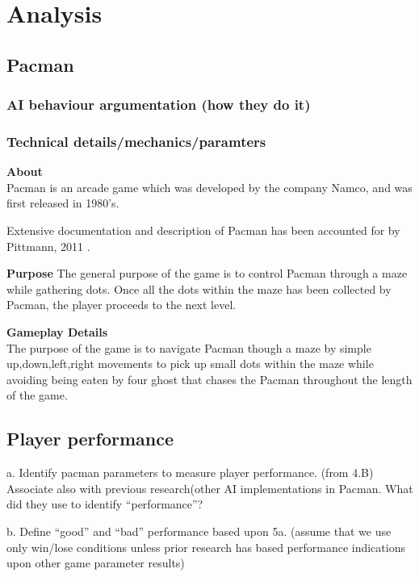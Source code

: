 \section{Analysis} \label{sec:analysis}




\subsection{Pacman}
\subsubsection{AI behaviour argumentation (how they do it)}
\subsubsection{Technical details/mechanics/paramters}

\textbf{About}\\
Pacman is an arcade game which was developed by the company Namco, and was first released in 1980's.

Extensive documentation and description of Pacman has been accounted for by Pittmann, 2011 \cite{Pitmann2011}.

\textbf{Purpose}
The general purpose of the game is to control Pacman through a maze while gathering dots. Once all the dots within the maze has been collected by Pacman, the player proceeds to the next level.







\textbf{Gameplay Details}\\
The purpose of the game is to navigate Pacman though a maze by simple up,down,left,right movements to pick up small dots within the maze while avoiding being eaten by four ghost that chases the Pacman throughout the length of the game.








\subsection{Player performance}
a. Identify pacman parameters to measure player performance. (from 4.B) Associate also with  previous research(other AI implementations in Pacman. What did they use to  identify “performance”?


b. Define “good” and “bad” performance based upon 5a. (assume that we use only win/lose conditions unless prior research has based performance indications upon other game parameter results)

